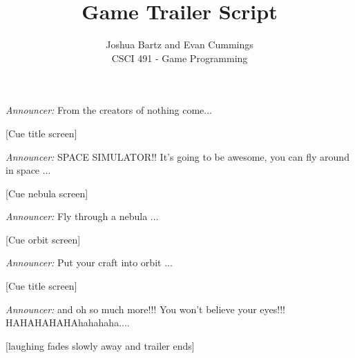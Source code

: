 
\usepackage[top=.5in, bottom=.75in, left=.75in, right=.75in]{geometry}


\small

\title{Game Trailer Script}
\author{Joshua Bartz and Evan Cummings\\
CSCI 491 - Game Programming}

\maketitle

\emph{Announcer:} From the creators of nothing come...
\vspace{5mm}

[Cue title screen]
\vspace{5mm}

\emph{Announcer:} SPACE SIMULATOR!!  It's going to be awesome, you can fly around in space ...
\vspace{5mm}

[Cue nebula screen]
\vspace{5mm}

\emph{Announcer:} Fly through a nebula ...
\vspace{5mm}

[Cue orbit screen]
\vspace{5mm}

\emph{Announcer:} Put your craft into orbit ...

\vspace{5mm}
[Cue title screen]
\vspace{5mm}

\emph{Announcer:} and oh so much more!!!  You won't believe your eyes!!! HAHAHAHAHAhahahaha....
\vspace{5mm}

[laughing fades slowly away and trailer ends]
\vspace{5mm}




